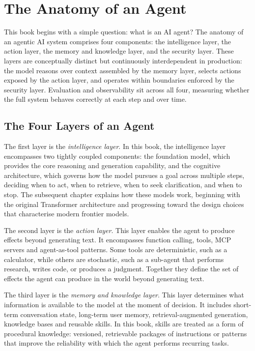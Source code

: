 \chapter{The Anatomy of an Agent}

This book begins with a simple question: what is an AI agent? The anatomy of an agentic
AI system comprises four components: the intelligence layer, the action layer, the memory
and knowledge layer, and the security layer. These layers are conceptually distinct but
continuously interdependent in production: the model reasons over context assembled by
the memory layer, selects actions exposed by the action layer, and operates within
boundaries enforced by the security layer. Evaluation and observability sit across all
four, measuring whether the full system behaves correctly at each step and over time.

\section{The Four Layers of an Agent}

The first layer is the \emph{intelligence layer}. In this book, the intelligence layer
encompasses two tightly coupled components: the foundation model, which provides the
core reasoning and generation capability, and the cognitive architecture, which governs
how the model pursues a goal across multiple steps, deciding when to act, when to
retrieve, when to seek clarification, and when to stop. The subsequent chapter explains
how these models work, beginning with the original Transformer architecture and
progressing toward the design choices that characterise modern frontier models.

The second layer is the \emph{action layer}. This layer enables the agent to produce
effects beyond generating text. It encompasses function calling, tools, MCP
servers and agent-as-tool patterns. Some tools are
deterministic, such as a calculator, while others are
stochastic, such as a sub-agent that performs research, writes code, or produces a
judgment. Together they define the set of effects the agent can produce in the world
beyond generating text.

The third layer is the \emph{memory and knowledge layer}. This layer determines what
information is available to the model at the moment of decision. It includes short-term
conversation state, long-term user memory, retrieval-augmented
generation, knowledge bases and reusable
skills. In this book, skills are treated as a form of procedural knowledge: versioned,
retrievable packages of instructions or patterns that improve the reliability with which
the agent performs recurring tasks.

